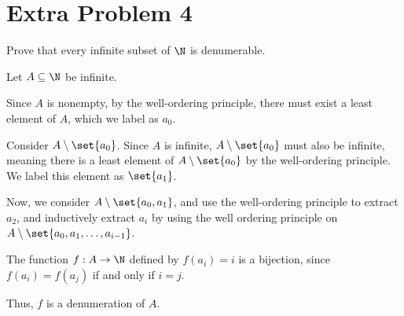 \documentclass[10pt]{mypackage}
\begin{document}
\section{Extra Problem 4}%
\begin{problem}
  Prove that every infinite subset of $\N$ is denumerable.
\end{problem}
\begin{solution}
  Let $A\subseteq \N$ be infinite.\newline

  Since $A$ is nonempty, by the well-ordering principle, there must exist a least element of $A$, which we label as $a_0$.\newline

  Consider $A\setminus \set{a_0}$. Since $A$ is infinite, $A\setminus \set{a_0}$ must also be infinite, meaning there is a least element of $A\setminus \set{a_0}$ by the well-ordering principle. We label this element as $\set{a_1}$.\newline

  Now, we consider $A\setminus \set{a_0,a_1}$, and use the well-ordering principle to extract $a_2$, and inductively extract $a_i$ by using the well ordering principle on $A\setminus \set{a_0,a_1,\dots,a_{i-1}}$.\newline

  The function $f: A\rightarrow \N$ defined by $f\left(a_i\right) = i$ is a bijection, since $f\left(a_i\right) = f\left(a_j\right)$ if and only if $i = j$.\newline

   Thus, $f$ is a denumeration of $A$.
\end{solution}
\end{document}
